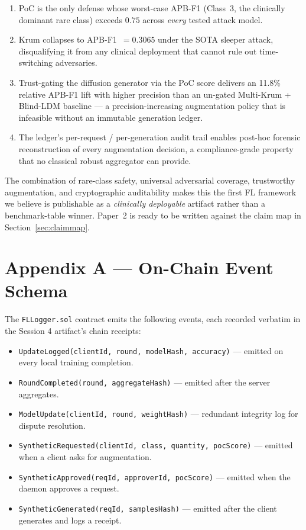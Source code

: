 \documentclass[11pt,a4paper]{article}
\begin{document}
\begin{enumerate}[nosep]
    \item PoC is the only defense whose worst-case APB-F1 (Class~3,
          the clinically dominant rare class) exceeds $0.75$ across
          \textit{every} tested attack model.
    \item Krum collapses to APB-F1~$=0.3065$ under the SOTA sleeper
          attack, disqualifying it from any clinical deployment that
          cannot rule out time-switching adversaries.
    \item Trust-gating the diffusion generator via the PoC score
          delivers an 11.8\% relative APB-F1 lift with higher precision
          than an un-gated Multi-Krum + Blind-LDM baseline --- a
          precision-increasing augmentation policy that is infeasible
          without an immutable generation ledger.
    \item The ledger's per-request / per-generation audit trail enables
          post-hoc forensic reconstruction of every augmentation
          decision, a compliance-grade property that no classical robust
          aggregator can provide.
\end{enumerate}

The combination of rare-class safety, universal adversarial coverage,
trustworthy augmentation, and cryptographic auditability makes this the
first FL framework we believe is publishable as a \textit{clinically
deployable} artifact rather than a benchmark-table winner. Paper~2 is
ready to be written against the claim map in
Section~\ref{sec:claimmap}.

\appendix
\section{Appendix A --- On-Chain Event Schema}
\label{app:events}

The \texttt{FLLogger.sol} contract emits the following events, each
recorded verbatim in the Session 4 artifact's chain receipts:

\begin{itemize}[nosep]
    \item \texttt{UpdateLogged(clientId, round, modelHash, accuracy)} --- emitted on every local training completion.
    \item \texttt{RoundCompleted(round, aggregateHash)} --- emitted after the server aggregates.
    \item \texttt{ModelUpdate(clientId, round, weightHash)} --- redundant integrity log for dispute resolution.
    \item \texttt{SyntheticRequested(clientId, class, quantity, pocScore)} --- emitted when a client asks for augmentation.
    \item \texttt{SyntheticApproved(reqId, approverId, pocScore)} --- emitted when the daemon approves a request.
    \item \texttt{SyntheticGenerated(reqId, samplesHash)} --- emitted after the client generates and logs a receipt.
\end{itemize}
\end{document}

